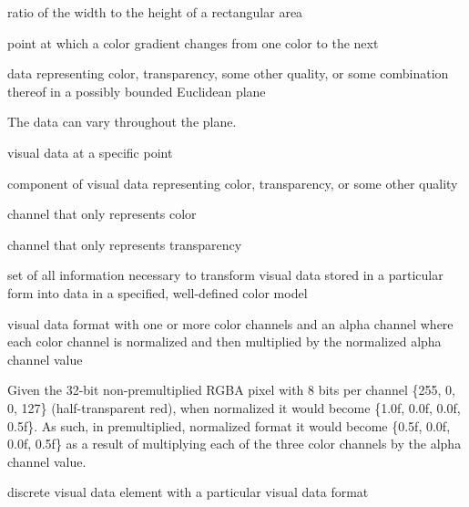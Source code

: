 %
ratio of the width to the height of a rectangular area

%
point at which a color gradient changes from one color to the next

%
data representing color, transparency, some other quality, or some combination thereof in a possibly bounded Euclidean plane \begin{note}
The data can vary throughout the plane.
\end{note}

%
visual data at a specific point

%
component of visual data representing color, transparency, or some other quality

%
channel that only represents color

%
channel that only represents transparency

%
set of all information necessary to transform visual data stored in a particular form into data in a specified, well-defined color model

%
visual data format with one or more color channels and an alpha channel where each color channel is normalized and then multiplied by the normalized alpha channel value
\begin{example}
Given the 32-bit non-premultiplied RGBA pixel with 8 bits per channel \{255, 0, 0, 127\} (half-transparent red), when normalized it would become \{1.0f, 0.0f, 0.0f, 0.5f\}. As such, in premultiplied, normalized format it would become \{0.5f, 0.0f, 0.0f, 0.5f\} as a result of multiplying each of the three color channels by the alpha channel value.
\end{example}

%
discrete visual data element with a particular visual data format

